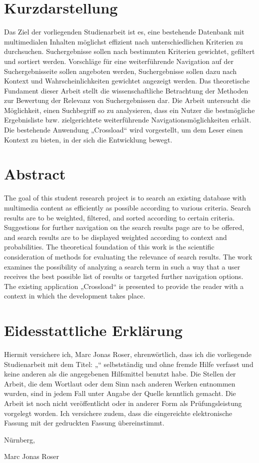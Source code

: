 \thispagestyle{empty}
\section*{Kurzdarstellung}
\label{sec:kurzdarstellung}
Das Ziel der vorliegenden Studienarbeit ist es, eine bestehende Datenbank mit multimedialen Inhalten möglichst effizient nach unterschiedlichen Kriterien zu durchsuchen.
Suchergebnisse sollen nach bestimmten Kriterien gewichtet, gefiltert und sortiert werden. Vorschläge für eine weiterführende Navigation auf der Suchergebnisseite sollen angeboten werden, Suchergebnisse sollen dazu nach Kontext und Wahrscheinlichkeiten gewichtet angezeigt werden.
Das theoretische Fundament dieser Arbeit stellt die wissenschaftliche Betrachtung der Methoden zur Bewertung der Relevanz von Suchergebnissen dar. Die Arbeit untersucht die Möglichkeit, einen Suchbegriff so zu analysieren, dass ein Nutzer die bestmögliche Ergebnisliste bzw. zielgerichtete weiterführende Navigationsmöglichkeiten erhält.
Die bestehende Anwendung „Crossload“ wird vorgestellt, um dem Leser einen Kontext zu bieten, in der sich die Entwicklung bewegt.

\section*{Abstract}
\label{sec:abstract}
The goal of this student research project is to search an existing database with multimedia content as efficiently as possible according to various criteria.
Search results are to be weighted, filtered, and sorted according to certain criteria. Suggestions for further navigation on the search results page are to be offered, and search results are to be displayed weighted according to context and probabilities.
The theoretical foundation of this work is the scientific consideration of methods for evaluating the relevance of search results. The work examines the possibility of analyzing a search term in such a way that a user receives the best possible list of results or targeted further navigation options.
The existing application „Crossload“ is presented to provide the reader with a context in which the development takes place.

\clearpage
\section*{Eidesstattliche Erklärung}
\label{sec:explanation}
Hiermit versichere ich, Marc Jonas Roser, ehrenwörtlich, dass ich die vorliegende Studienarbeit mit dem Titel: „\titel“ selbstständig und ohne fremde Hilfe verfasst und keine anderen als die angegebenen Hilfsmittel benutzt habe. Die Stellen der Arbeit, die dem Wortlaut oder dem Sinn nach anderen Werken entnommen wurden, sind in jedem Fall unter Angabe der Quelle kenntlich gemacht. Die Arbeit ist noch nicht veröffentlicht oder in anderer Form als Prüfungsleistung vorgelegt worden.
Ich versichere zudem, dass die eingereichte elektronische Fassung mit der gedruckten Fassung übereinstimmt.

Nürnberg, \publishDate

Marc Jonas Roser
